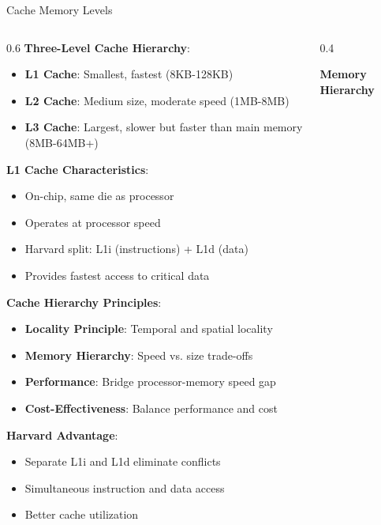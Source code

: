 \documentclass[aspectratio=169]{beamer}
\newcommand{\concept}[1]{\textbf{\color{darkblue}#1}}
\begin{document}
\begin{frame}{Cache Memory Levels}
\begin{columns}
\begin{column}{0.6\textwidth}
\concept{Three-Level Cache Hierarchy}:
\begin{itemize}
\item \textbf{L1 Cache}: Smallest, fastest (8KB-128KB)
\item \textbf{L2 Cache}: Medium size, moderate speed (1MB-8MB)
\item \textbf{L3 Cache}: Largest, slower but faster than main memory (8MB-64MB+)
\end{itemize}

\vspace{0.3cm}
\concept{L1 Cache Characteristics}:
\begin{itemize}
\item On-chip, same die as processor
\item Operates at processor speed
\item Harvard split: L1i (instructions) + L1d (data)
\item Provides fastest access to critical data
\end{itemize}

\vspace{0.3cm}
\concept{Cache Hierarchy Principles}:
\begin{itemize}
\item \textbf{Locality Principle}: Temporal and spatial locality
\item \textbf{Memory Hierarchy}: Speed vs. size trade-offs
\item \textbf{Performance}: Bridge processor-memory speed gap
\item \textbf{Cost-Effectiveness}: Balance performance and cost
\end{itemize}

\vspace{0.3cm}
\concept{Harvard Advantage}:
\begin{itemize}
\item Separate L1i and L1d eliminate conflicts
\item Simultaneous instruction and data access
\item Better cache utilization
\end{itemize}
\end{column}
\begin{column}{0.4\textwidth}
\begin{center}
\textbf{Memory Hierarchy}
\vspace{0.3cm}


\end{center}
\end{column}
\end{columns}
\end{frame}
\end{document}

